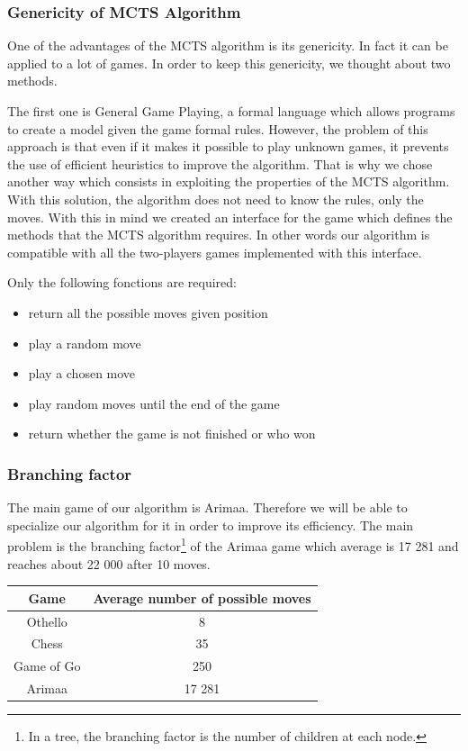 \subsubsection{Genericity of MCTS Algorithm}

One of the advantages of the MCTS algorithm is its genericity. In fact it can be applied to a lot of games. In order to keep this genericity, we thought about two methods.

The first one is General Game Playing\cite{General_Game_Playing}, a formal language which allows programs to create a model given the game formal rules. However, the problem of this approach is that even if it makes it possible to play unknown games, it prevents the use of efficient heuristics to improve the algorithm.
That is why we chose another way which consists in exploiting the properties of the MCTS algorithm. 
With this solution, the algorithm does not need to know the rules, only the moves. With this in mind we created an interface for the game which defines the methods that the MCTS algorithm requires. In other words our algorithm is compatible with all the two-players games implemented with this interface.

Only the following fonctions are required: 
\begin{itemize}[nolistsep]
\item return all the possible moves given position
\item play a random move
\item play a chosen move 
\item play random moves until the end of the game
\item return whether the game is not finished or who won
\end{itemize}

\subsubsection{Branching factor}

The main game of our algorithm is Arimaa. Therefore we will be able to specialize our algorithm for it in order to improve its efficiency. The main problem is the branching factor\footnote{In a tree, the branching factor is the number of children at each node.} of the Arimaa game which average is 17 281 and reaches about 22 000 after 10 moves\cite{branchin_factor}.

\begin{center}
	\begin{tabular}{ | c | c |}
		\hline Game & Average number of possible moves \\ \hline
		\hline  
		Othello & 8\\
		\hline  
		Chess & 35\\
		\hline  
		Game of Go & 250\\
		\hline
		Arimaa & 17 281\\
		\hline
	\end{tabular}
\end{center}

